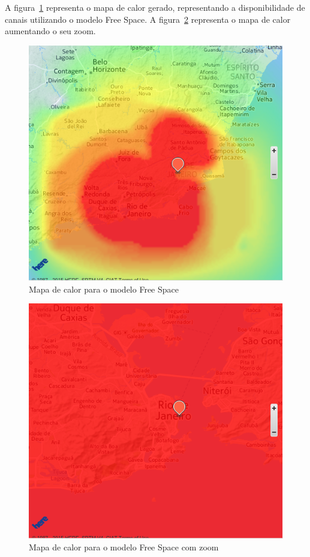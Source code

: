 A figura~\ref{fig:freespacesout} representa o mapa de calor gerado, representando a disponibilidade de canais utilizando o modelo Free Space. A figura~\ref{fig:freespacesin} representa o mapa de calor aumentando o seu zoom.

\begin{figure}[htb]
\centering
\includegraphics[width=1.0\textwidth]{figs/freespacesout}
\caption[Mapa de calor para o modelo Free Space]
{Mapa de calor para o modelo Free Space}
\label{fig:freespacesout}
\end{figure} 

\begin{figure}[htb]
\centering
\includegraphics[width=1.0\textwidth]{figs/freespacesin}
\caption[Mapa de calor para o modelo Free Space com zoom]
{Mapa de calor para o modelo Free Space com zoom}
\label{fig:freespacesin}
\end{figure} 


